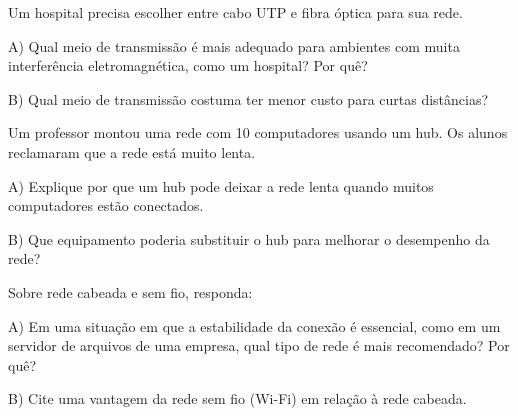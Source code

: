 \documentclass[12pt]{modelo/prova2}
\begin{document}
\question[1] Um hospital precisa escolher entre cabo UTP e fibra óptica para sua rede.

A) Qual meio de transmissão é mais adequado para ambientes com muita interferência eletromagnética, como um hospital? Por quê?

\vspace{5\baselineskip}

B) Qual meio de transmissão costuma ter menor custo para curtas distâncias?

\vspace{5\baselineskip}


\question[2] Um professor montou uma rede com 10 computadores usando um hub. Os alunos reclamaram que a rede está muito lenta.

A) Explique por que um hub pode deixar a rede lenta quando muitos computadores estão conectados.

\vspace{5\baselineskip}

B) Que equipamento poderia substituir o hub para melhorar o desempenho da rede?

\vspace{5\baselineskip}


\question[2] Sobre rede cabeada e sem fio, responda:

A) Em uma situação em que a estabilidade da conexão é essencial, como em um servidor de arquivos de uma empresa, qual tipo de rede é mais recomendado? Por quê?

\vspace{5\baselineskip}

B) Cite uma vantagem da rede sem fio (Wi-Fi) em relação à rede cabeada.

\vspace{5\baselineskip}
\end{document}
